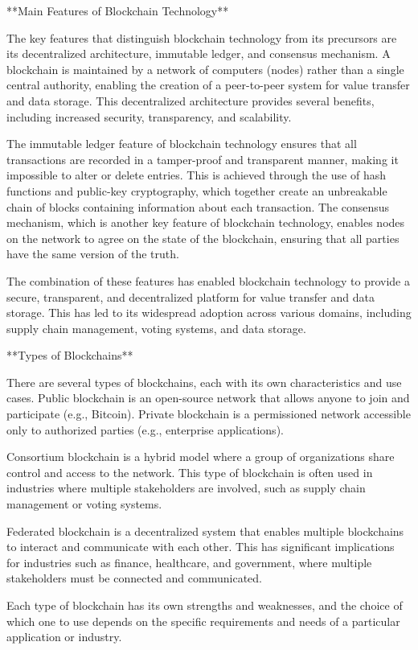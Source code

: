 \begin{documen}
**Main Features of Blockchain Technology**

The key features that distinguish blockchain technology from its precursors are its decentralized architecture, immutable ledger, and consensus mechanism. A blockchain is maintained by a network of computers (nodes) rather than a single central authority, enabling the creation of a peer-to-peer system for value transfer and data storage. This decentralized architecture provides several benefits, including increased security, transparency, and scalability.

The immutable ledger feature of blockchain technology ensures that all transactions are recorded in a tamper-proof and transparent manner, making it impossible to alter or delete entries. This is achieved through the use of hash functions and public-key cryptography, which together create an unbreakable chain of blocks containing information about each transaction. The consensus mechanism, which is another key feature of blockchain technology, enables nodes on the network to agree on the state of the blockchain, ensuring that all parties have the same version of the truth.

The combination of these features has enabled blockchain technology to provide a secure, transparent, and decentralized platform for value transfer and data storage. This has led to its widespread adoption across various domains, including supply chain management, voting systems, and data storage.

**Types of Blockchains**

There are several types of blockchains, each with its own characteristics and use cases. Public blockchain is an open-source network that allows anyone to join and participate (e.g., Bitcoin). Private blockchain is a permissioned network accessible only to authorized parties (e.g., enterprise applications).

Consortium blockchain is a hybrid model where a group of organizations share control and access to the network. This type of blockchain is often used in industries where multiple stakeholders are involved, such as supply chain management or voting systems.

Federated blockchain is a decentralized system that enables multiple blockchains to interact and communicate with each other. This has significant implications for industries such as finance, healthcare, and government, where multiple stakeholders must be connected and communicated.

Each type of blockchain has its own strengths and weaknesses, and the choice of which one to use depends on the specific requirements and needs of a particular application or industry.


\end{documen}

